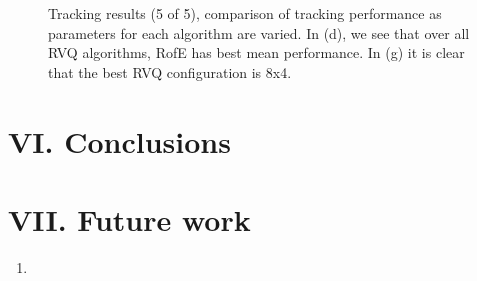 \begin{frame}
\begin{figure}[h!]
\caption{Tracking results (5 of 5), comparison of tracking performance as parameters for each algorithm are varied.  In (d), we see that over all RVQ algorithms, RofE has best mean performance.  In (g) it is clear that the best RVQ configuration is 8x4.}
\label{fig:results_final_5_configs}
\end{figure}
\end{frame}


\section{VI. Conclusions}

\section{VII. Future work}
\begin{enumerate}
\item 
\end{enumerate}
